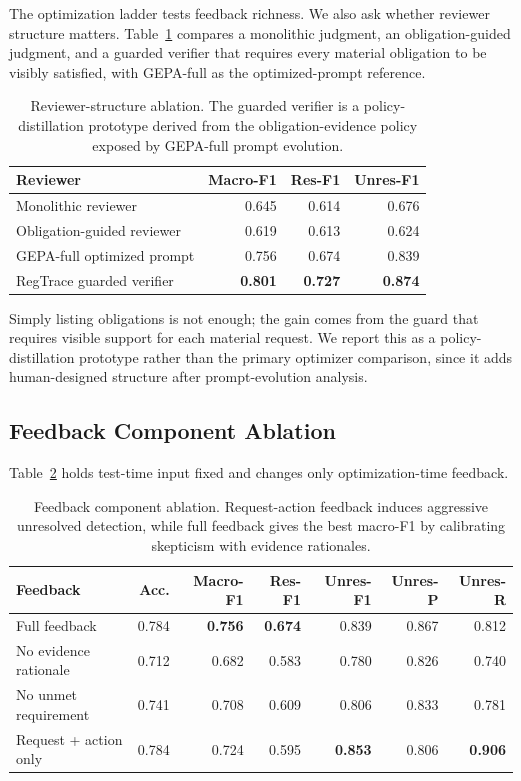 \documentclass[11pt]{article}
\begin{document}
The optimization ladder tests feedback richness. We also ask whether reviewer structure matters. Table~\ref{tab:guarded} compares a monolithic judgment, an obligation-guided judgment, and a guarded verifier that requires every material obligation to be visibly satisfied, with GEPA-full as the optimized-prompt reference.

\begin{table}[t]
\centering
\scriptsize
\setlength{\tabcolsep}{4pt}
\begin{tabular}{lrrr}
\toprule
\textbf{Reviewer} & \textbf{Macro-F1} & \textbf{Res-F1} & \textbf{Unres-F1} \\
\midrule
Monolithic reviewer & 0.645 & 0.614 & 0.676 \\
Obligation-guided reviewer & 0.619 & 0.613 & 0.624 \\
GEPA-full optimized prompt & 0.756 & 0.674 & 0.839 \\
RegTrace guarded verifier & \textbf{0.801} & \textbf{0.727} & \textbf{0.874} \\
\bottomrule
\end{tabular}
\caption{Reviewer-structure ablation. The guarded verifier is a policy-distillation prototype derived from the obligation-evidence policy exposed by GEPA-full prompt evolution.}
\label{tab:guarded}
\end{table}

Simply listing obligations is not enough; the gain comes from the guard that requires visible support for each material request. We report this as a policy-distillation prototype rather than the primary optimizer comparison, since it adds human-designed structure after prompt-evolution analysis.

\subsection{Feedback Component Ablation}

Table~\ref{tab:feedback} holds test-time input fixed and changes only optimization-time feedback.

\begin{table}[t]
\centering
\small
\begin{tabular}{lrrrrrr}
\toprule
\textbf{Feedback} & \textbf{Acc.} & \textbf{Macro-F1} & \textbf{Res-F1} & \textbf{Unres-F1} & \textbf{Unres-P} & \textbf{Unres-R} \\
\midrule
Full feedback & 0.784 & \textbf{0.756} & \textbf{0.674} & 0.839 & 0.867 & 0.812 \\
No evidence rationale & 0.712 & 0.682 & 0.583 & 0.780 & 0.826 & 0.740 \\
No unmet requirement & 0.741 & 0.708 & 0.609 & 0.806 & 0.833 & 0.781 \\
Request + action only & 0.784 & 0.724 & 0.595 & \textbf{0.853} & 0.806 & \textbf{0.906} \\
\bottomrule
\end{tabular}
\caption{Feedback component ablation. Request-action feedback induces aggressive unresolved detection, while full feedback gives the best macro-F1 by calibrating skepticism with evidence rationales.}
\label{tab:feedback}
\end{table}
\end{document}
